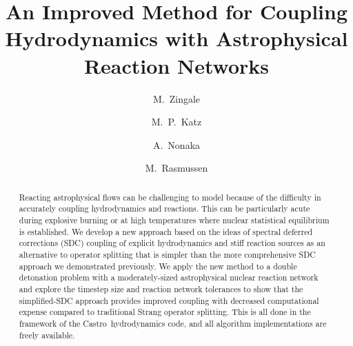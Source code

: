 \documentclass[linenumbers,trackchanges]{aastex631}
\newcommand{\castro}{{\sf Castro}}
\begin{document}
\title{An Improved Method for Coupling Hydrodynamics with Astrophysical Reaction Networks}



\shortauthors{}

\author[0000-0001-8401-030X]{M.~Zingale}

\author[0000-0003-0439-4556]{M.~P.~Katz}

\author[0000-0003-1791-0265]{A.~Nonaka}

\author[0000-0002-0297-0313]{M.~Rasmussen}



\begin{abstract}
Reacting astrophysical flows can be challenging to model because of
the difficulty in accurately coupling hydrodynamics and reactions.
This can be particularly acute during explosive burning or at high
temperatures where nuclear statistical equilibrium is established.  We
develop a new approach based on the ideas of spectral deferred
corrections (SDC) coupling of explicit hydrodynamics and stiff
reaction sources as an alternative to operator splitting that is simpler
than the more
comprehensive SDC approach we demonstrated previously.  We apply the
new method to a double detonation problem with a moderately-sized
astrophysical nuclear reaction network and explore the timestep size
and reaction network tolerances to show that the simplified-SDC
approach provides improved coupling with decreased computational
expense compared to traditional Strang operator
splitting.  This is all done in the framework of the
\castro\ hydrodynamics code, and all algorithm implementations are
freely available.
\end{abstract}
\end{document}
